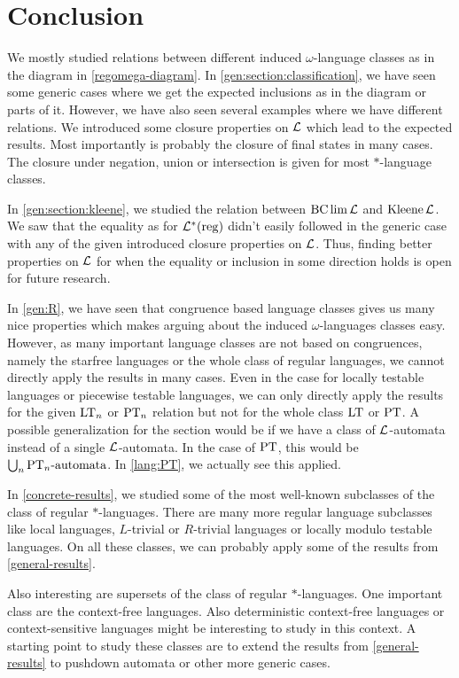 \section{Conclusion}
\label{chapter:conclusion}

We mostly studied relations between different induced $\omega$-language classes as in the diagram in \cref{regomega-diagram}. In \cref{gen:section:classification}, we have seen some generic cases where we get the expected inclusions as in the diagram or parts of it. However, we have also seen several examples where we have different relations. We introduced some closure properties on $\mathcal{L}$ which lead to the expected results. Most importantly is probably the closure of final states in many cases. The closure under negation, union or intersection is given for most $*$-language classes.

In \cref{gen:section:kleene}, we studied the relation between $\operatorname{BC} \lim \mathcal{L}$ and $\operatorname{Kleene} \mathcal{L}$. We saw that the equality as for $\mathcal{L}^*(\textup{\textrm{reg}})$ didn't easily followed in the generic case with any of the given introduced closure properties on $\mathcal{L}$. Thus, finding better properties on $\mathcal{L}$ for when the equality or inclusion in some direction holds is open for future research.

In \cref{gen:R}, we have seen that congruence based language classes gives us many nice properties which makes arguing about the induced $\omega$-languages classes easy. However, as many important language classes are not based on congruences, namely the starfree languages or the whole class of regular languages, we cannot directly apply the results in many cases. Even in the case for locally testable languages or piecewise testable languages, we can only directly apply the results for the given $\textup{\textrm{LT}}_n$ or $\textup{\textrm{PT}}_n$ relation but not for the whole class $\textup{\textrm{LT}}$ or $\textup{\textrm{PT}}$. A possible generalization for the section would be if we have a class of $\mathcal{L}$-automata instead of a single $\mathcal{L}$-automata. In the case of $\textup{\textrm{PT}}$, this would be $\bigcup_n \text{$\textup{\textrm{PT}}_n$-automata}$. In \cref{lang:PT}, we actually see this applied.

In \cref{concrete-results}, we studied some of the most well-known subclasses of the class of regular $*$-languages. There are many more regular language subclasses like local languages, $L$-trivial or $R$-trivial languages or locally modulo testable languages. On all these classes, we can probably apply some of the results from \cref{general-results}.

Also interesting are supersets of the class of regular $*$-languages. One important class are the context-free languages. Also deterministic context-free languages or context-sensitive languages might be interesting to study in this context. A starting point to study these classes are to extend the results from \cref{general-results} to pushdown automata or other more generic cases.
